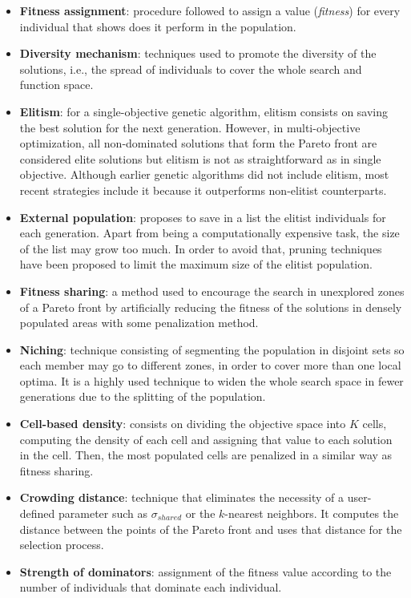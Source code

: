     \begin{itemize}[label={--}]
        \item \textbf{Fitness assignment}: procedure followed to assign a value (\textit{fitness}) for every individual that shows  does it perform in the population.
        \item \textbf{Diversity mechanism}: techniques used to promote the diversity of the solutions, i.e., the spread of individuals to cover the whole search and function space.        

        \newpage

        \item \textbf{Elitism}: for a single-objective genetic algorithm, elitism consists on saving the best solution for the next generation. However, in multi-objective optimization, all non-dominated solutions that form the Pareto front are considered elite solutions but elitism is not as straightforward as in single objective. Although earlier genetic algorithms did not include elitism, most recent strategies include it because it outperforms non-elitist counterparts.
        \item \textbf{External population}: proposes to save in a list the elitist individuals for each generation. Apart from being a computationally expensive task, the size of the list may grow too much. In order to avoid that, pruning techniques have been proposed to limit the maximum size of the elitist population.
        \item \textbf{Fitness sharing}: a method used to encourage the search in unexplored zones of a Pareto front by artificially reducing the fitness of the solutions in densely populated areas with some penalization method.
        \item \textbf{Niching}: technique consisting of segmenting the population in disjoint sets so each member may go to different zones, in order to cover more than one local optima. It is a highly used technique to widen the whole search space in fewer generations due to the splitting of the population.
        \item \textbf{Cell-based density}: consists on dividing the objective space into $K$ cells, computing the density of each cell and assigning that value to each solution in the cell. Then, the most populated cells are penalized in a similar way as fitness sharing.
        \item \textbf{Crowding distance}: technique that eliminates the necessity of a user-defined parameter such as $\sigma_{shared}$ or the $k$-nearest neighbors. It computes the distance between the points of the Pareto front and uses that distance for the selection process.
        \item \textbf{Strength of dominators}: assignment of the fitness value according to the number of individuals that dominate each individual.
    \end{itemize}
    
